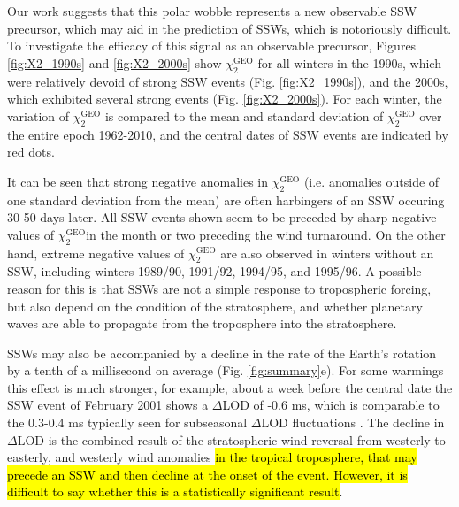 \documentclass[draft,jgrga]{agutex}
\begin{document}
\begin{article}
Our work suggests that this polar wobble represents a new observable SSW precursor, which  may aid in the prediction of SSWs, which is notoriously difficult.
 {To investigate the efficacy of this signal as an observable precursor, Figures} \ref{fig:X2_1990s} and \ref{fig:X2_2000s}  {show $\chi_2^{\text{GEO}}$ for all winters in the 1990s, which were relatively devoid of strong SSW events} (Fig. \ref{fig:X2_1990s}),  {and the 2000s, which exhibited several strong events} (Fig. \ref{fig:X2_2000s}).
 {For each winter, the variation of $\chi_2^{\text{GEO}}$ is compared to the mean and standard deviation of $\chi_2^{\text{GEO}}$ over the entire epoch 1962-2010, and the central dates of SSW events are indicated by red dots.}

 {It can be seen that strong negative anomalies in $\chi_2^{\text{GEO}}$ (i.e. anomalies outside of one standard deviation from the mean) are often harbingers of an SSW occuring 30-50 days later.
All SSW events shown seem to be preceded by sharp negative values of $\chi_2^{\text{GEO}}$in the month or two preceding the wind turnaround.
On the other hand, extreme negative values of $\chi_2^{\text{GEO}}$ are also observed in winters without an SSW, including winters 1989/90, 1991/92, 1994/95, and 1995/96.
A possible reason for this is that SSWs are not a simple response to tropospheric forcing, but also depend on the condition of the stratosphere, and whether planetary waves are able to propagate from the troposphere into the stratosphere. }


SSWs may also be accompanied by a decline in the rate of the Earth's rotation by a tenth of a millisecond on average (Fig. \ref{fig:summary}e).
For some warmings this effect is much stronger, for example, about a week before the central date the SSW event of February 2001 shows a $\Delta$LOD of -0.6 ms, which is comparable to the  0.3-0.4 ms typically seen for subseasonal $\Delta$LOD fluctuations \citep{eubanksetal1985,rosenetal1991}.
The decline in $\Delta$LOD is the combined result of the stratospheric wind reversal from westerly to easterly, and westerly wind anomalies \hl{in the tropical troposphere, that may precede an SSW and then decline at the onset of the event.  
However, it is difficult to say whether this is a statistically significant result}.


\end{article}
\end{document}
